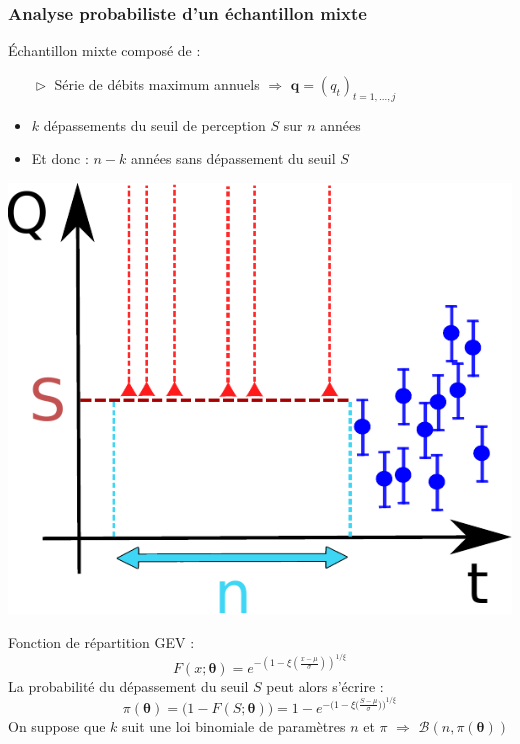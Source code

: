 \documentclass[compress,9pt]{beamer}
\begin{document}
	
	\begin{frame}[t]
		\frametitle{Analyse probabiliste d'un échantillon mixte}
		\begin{minipage}{0.7\textwidth}
			Échantillon mixte composé de :
			\begin{itemize}
				\item [$\vartriangleright$] Série de débits maximum annuels $\Rightarrow$ $\boldsymbol{q}= (q_t)_{t=1,...,j}$
				\vspace{5pt}
				\item<2-> [$\vartriangleright$] $k$ dépassements du seuil de perception $S$ sur $n$ années
				\item<3-> [$\vartriangleright$] Et donc : $n-k$ années sans dépassement du seuil $S$
			\end{itemize}
		\end{minipage}
		\begin{minipage}{0.28\textwidth}
			\includegraphics[width = .9\textwidth]{./Figures/Sn.pdf}
		\end{minipage}
		\vfill
		 Fonction de répartition GEV : 
		\onslide<4-> \begin{equation}
			F(x;\boldsymbol{\theta}) = e^{-(1-\xi(\frac{x - \mu}{\sigma}))^{1/\xi}}
		\end{equation}
		\vfill
		\onslide<5-> La probabilité du dépassement du seuil $S$ peut alors s'écrire :	\\
		\onslide<5-> \begin{equation}
			\pi (\boldsymbol{\theta}) = \biggl( 1 - F(S;\boldsymbol{\theta})\biggl) = 1 - e^{-\biggl(1-\xi\bigl(\frac{S-\mu}{\sigma}\bigl)\biggl)^{1/\xi} }		
		\end{equation}
		\vfill
		\onslide<6-> On suppose que $k$ suit une loi binomiale de paramètres $n$ et $\pi$ $\Rightarrow$ $\mathcal{B}(n,\pi(\boldsymbol{\theta}))$
	\end{frame}		
		
\end{document}
